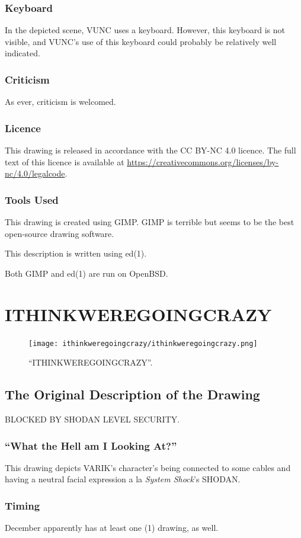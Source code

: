 \documentclass{report}
\begin{document}
\subsection{Keyboard}
In the depicted scene, VUNC uses a keyboard.  However, this keyboard is not visible, and VUNC's use of this keyboard could probably be relatively well indicated.
\subsection{Criticism}
As ever, criticism is welcomed.
\subsection{Licence}
This drawing is released in accordance with the CC BY-NC 4.0 licence.  The full text of this licence is available at \url{https://creativecommons.org/licenses/by-nc/4.0/legalcode}.
\subsection{Tools Used}
This drawing is created using GIMP.  GIMP is terrible but seems to be the best open-source drawing software.

This description is written using ed(1).

Both GIMP and ed(1) are run on OpenBSD.
\chapter{ITHINKWEREGOINGCRAZY}
\begin{figure}[ht]
	\centering
	\texttt{[image: ithinkweregoingcrazy/ithinkweregoingcrazy.png]}
	\caption[center]{``ITHINKWEREGOINGCRAZY''.}
\end{figure}
\section{The Original Description of the Drawing}
BLOCKED BY SHODAN LEVEL SECURITY.
\subsection{``What the Hell am I Looking At?''}
This drawing depicts VARIK's character's being connected to some cables and having a neutral facial expression a la \textit{System Shock}'s SHODAN.
\subsection{Timing}
December apparently has at least one (1) drawing, as well.
\end{document}
